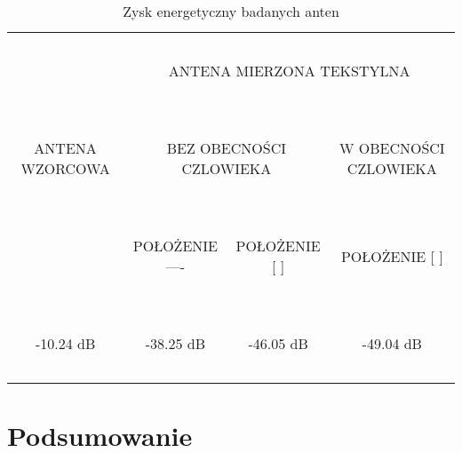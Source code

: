 \begin{table}[h]
\begin{center}
    \begin{tabular}{|c|c|c|c|}
    \hline
    ~               & \multicolumn{3}{c|}{~}     \\
    ~               & \multicolumn{3}{c|}{ANTENA MIERZONA TEKSTYLNA } \\
    ~               & \multicolumn{3}{c|}{~}     \\ \hline
    ~               & \multicolumn{2}{c|}{~}     & ~                                  \\
    ANTENA WZORCOWA & \multicolumn{2}{c|}{BEZ OBECNOŚCI CZLOWIEKA} & W OBECNOŚCI CZLOWIEKA              \\
    ~               & \multicolumn{2}{c|}{~}     & ~                                  \\ \hline
    ~               & ~                          & ~                                  & ~                                  \\
    ~               & POŁOŻENIE ----             & POŁOŻENIE [     ]                  & POŁOŻENIE [    ]                   \\
    ~               & ~                          & ~                                  & ~                                  \\ \hline
    ~               & ~                          & ~                                  & ~                                  \\
    -10.24 dB       & -38.25 dB                  & -46.05 dB                          & -49.04 dB                          \\
    ~               & ~                          & ~                                  & ~                                  \\ \hline
    \end{tabular}
    \caption{Zysk energetyczny badanych anten}
\end{center}
\end{table}








\chapter{Podsumowanie}








